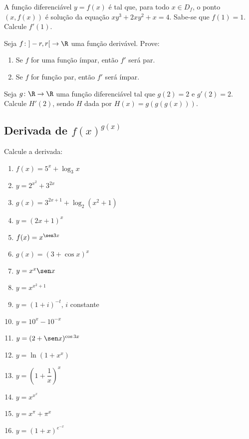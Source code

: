 \begin{exercicio}[28]
\label{ex:7.11.28}
A função diferenciável $y = f(x)$ é tal que, para todo $x \in D_f$, o ponto $(x, f(x))$ é solução da equação $xy^3 + 2xy^2 + x = 4$. Sabe-se que $f(1) = 1$. Calcule $f'(1)$.
\end{exercicio}

\begin{exercicio}[29]
\label{ex:7.11.29}
Seja $f\colon {]-r, r[} \to \R$ uma função derivável. Prove:
\begin{enumerate}[label=\alph*)]
    \item Se $f$ for uma função ímpar, então $f'$ será par.
    \item Se $f$ for função par, então $f'$ será ímpar.
\end{enumerate}
\end{exercicio}

\begin{exercicio}[30]
\label{ex:7.11.30}
Seja $g\colon \R \to \R$ uma função diferenciável tal que $g(2) = 2$ e $g'(2) = 2$. Calcule $H'(2)$, sendo $H$ dada por $H(x) = g(g(g(x)))$.
\end{exercicio}

\clearpage

\subsection{Derivada de $f(x)^{g(x)}$}

\begin{exercicio}[1]
\label{ex:7.12.1}
Calcule a derivada:
\begin{enumerate}[label=\alph*)]
    \item $f(x) = 5^x + \log_3 x$
    \item $y = 2^{x^2} + 3^{2x}$
    \item $g(x) = 3^{2x + 1} + \log_2 (x^2 + 1)$
    \item $y = (2x + 1)^x$
    \item $f(x) = x^{\sen 3x}$
    \item $g(x) = (3 + \cos x)^x$
    \item $y = x^x \sen x$
    \item $y = x^{x^2 + 1}$
    \item $y = (1 + i)^{-t}$, $i$ constante
    \item $y = 10^x - 10^{-x}$
    \item $y = (2 + \sen x)^{\cos 3x}$
    \item $y = \ln(1 + x^x)$
    \item $y = \left(1 + \dfrac{1}{x}\right)^{\!x}$
    \item $y = x^{x^x}$
    \item $y = x^\pi + \pi^x$
    \item $y = (1 + x)^{e^{-x}}$
\end{enumerate}
\end{exercicio}

